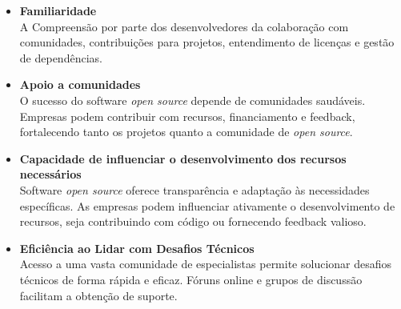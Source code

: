 \begin{itemize}
  \item \textbf{Familiaridade}\\
  A Compreensão por parte dos desenvolvedores da colaboração com comunidades, contribuições para projetos, entendimento de licenças e gestão de dependências.
  \item \textbf{Apoio a comunidades}\\
  O sucesso do software \textit{open source} depende de comunidades saudáveis. Empresas podem contribuir com recursos, financiamento e feedback, fortalecendo tanto os projetos quanto a comunidade de \textit{open source}.
  \item \textbf{Capacidade de influenciar o desenvolvimento dos recursos necessários}\\
  Software \textit{open source} oferece transparência e adaptação às necessidades específicas. As empresas podem influenciar ativamente o desenvolvimento de recursos, seja contribuindo com código ou fornecendo feedback valioso.
  \item \textbf{Eficiência ao Lidar com Desafios Técnicos}\\
  Acesso a uma vasta comunidade de especialistas permite solucionar desafios técnicos de forma rápida e eficaz. Fóruns online e grupos de discussão facilitam a obtenção de suporte.
\end{itemize}